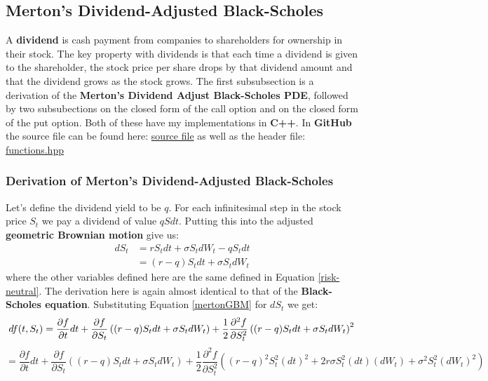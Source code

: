 \documentclass[12pt]{article}
\numberwithin{equation}{section}
\begin{document}
\subsection{Merton's Dividend-Adjusted Black-Scholes}
A \textbf{dividend} is cash payment from companies to shareholders for ownership in their stock. The key property with dividends is that each time a dividend is given to the shareholder, the stock price per share drops by that dividend amount and that the dividend grows as the stock grows. 
\newline\newline
The first subsubsection is a derivation of the \textbf{Merton's Dividend Adjust Black-Scholes PDE}, followed by two subsubections on the closed form of the call option and on the closed form of the put option. \newline \newline Both of these have my implementations in \textbf{C++}. In \textbf{GitHub} the source file can be found here: \href{https://github.com/neeldevsen/one-pricer-a-day/blob/main/day3-MertonDividendBSE.cpp}{source file} \newline
as well as the header file: \href{https://github.com/neeldevsen/one-pricer-a-day/blob/main/functions.hpp}{functions.hpp}


\subsubsection{Derivation of Merton's Dividend-Adjusted Black-Scholes}
Let's define the dividend yield to be $q$.  For each infinitesimal step in the stock price $S_t$ we pay a dividend of value $qSdt$. Putting this into the adjusted \textbf{geometric Brownian motion} give us:
\begin{equation}
	\begin{aligned}
			dS_t &= rS_tdt + \sigma S_t dW_t - qS_tdt \\
			 &= (r-q)S_tdt + \sigma S_t dW_t 
	\end{aligned}
	\label{mertonGBM}
\end{equation}
where the other variables defined here are the same defined in Equation \ref{risk-neutral}. The derivation here is again almost identical to that of the \textbf{Black-Scholes equation}. 
Substituting Equation \ref{mertonGBM} for $dS_t$ we get:
\begin{equation*}
df(t,S_t) = \frac{\partial f}{\partial t} dt 
		+ \frac{\partial f}{\partial S_t}
		\left((r-q)S_tdt + \sigma S_t dW_t\right) 
		+ \frac{1}{2}\frac{\partial^2 f}{\partial S_t^2}
		\left((r-q)S_tdt + \sigma S_t dW_t\right)^2 \\ 
\end{equation*}
\begin{equation}
= \frac{\partial f}{\partial t}dt
	+ \frac{\partial f}{\partial S_t}
	\left((r-q)S_tdt + \sigma S_tdW_t\right)
	+ \frac{1}{2}
	\frac{\partial^2 f}{\partial S_t^2}
	\left((r-q)^2S_t^2(dt)^2 + 2r\sigma S_t^2(dt)(dW_t) + \sigma^2S_t^2(dW_t)^2\right)
	\label{derivationbspdemerton}
	\end{equation}
\end{document}
